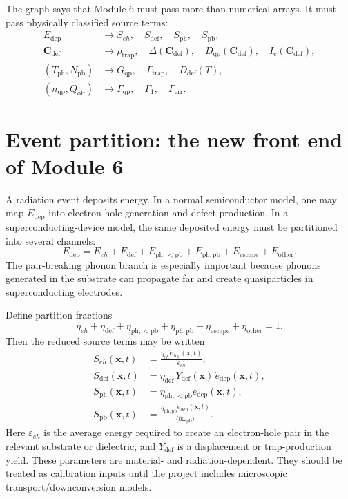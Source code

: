 \documentclass[11pt]{article}
\newcommand{\x}{\bm{x}}
\newcommand{\Edep}{E_{\mathrm{dep}}}
\newcommand{\edot}{\dot{e}_{\mathrm{dep}}}
\newcommand{\Qoff}{Q_{\mathrm{off}}}
\newcommand{\Cvec}{\bm{C}_{\mathrm{def}}}
\newcommand{\Tph}{T_{\mathrm{ph}}}
\newcommand{\Npb}{N_{\mathrm{pb}}}
\newcommand{\DeltaSC}{\Delta}
\newcommand{\nqp}{n_{\mathrm{qp}}}
\newcommand{\Dqp}{D_{\mathrm{qp}}}
\newcommand{\Gqp}{G_{\mathrm{qp}}}
\newcommand{\Gammaqp}{\Gamma_{\mathrm{qp}}}
\newcommand{\Gammaone}{\Gamma_1}
\newcommand{\Gammaerr}{\Gamma_{\mathrm{err}}}
\newcommand{\Ic}{I_{\mathrm{c}}}
\begin{document}
The graph says that Module 6 must pass more than numerical arrays. It must pass physically classified source terms:
\begin{align}
\Edep &\rightarrow S_{eh},\quad S_{\mathrm{def}},\quad S_{\mathrm{ph}},\quad S_{\mathrm{pb}},\\
\Cvec &\rightarrow \rho_{\mathrm{trap}},\quad \DeltaSC(\Cvec),\quad \Dqp(\Cvec),\quad \Ic(\Cvec),\\
(\Tph,\Npb) &\rightarrow \Gqp,\quad \Gamma_{\mathrm{trap}},\quad D_{\mathrm{def}}(T),\\
(\nqp,\Qoff) &\rightarrow \Gammaqp,\quad \Gammaone,\quad \Gammaerr.
\end{align}

\section{Event partition: the new front end of Module 6}

A radiation event deposits energy. In a normal semiconductor model, one may map \(\Edep\) into electron-hole generation and defect production. In a superconducting-device model, the same deposited energy must be partitioned into several channels:
\begin{equation}
\Edep
=E_{eh}+E_{\mathrm{def}}+E_{\mathrm{ph,<pb}}+E_{\mathrm{ph,pb}}+E_{\mathrm{escape}}+E_{\mathrm{other}}.
\end{equation}
The pair-breaking phonon branch is especially important because phonons generated in the substrate can propagate far and create quasiparticles in superconducting electrodes.

Define partition fractions
\begin{equation}
\eta_{eh}+\eta_{\mathrm{def}}+\eta_{\mathrm{ph,<pb}}+\eta_{\mathrm{ph,pb}}+\eta_{\mathrm{escape}}+\eta_{\mathrm{other}}=1.
\end{equation}
Then the reduced source terms may be written
\begin{align}
S_{eh}(\x,t) &= \frac{\eta_{eh}\edot(\x,t)}{\varepsilon_{eh}},\\
S_{\mathrm{def}}(\x,t) &= \eta_{\mathrm{def}}\,Y_{\mathrm{def}}(\x)\,\edot(\x,t),\\
S_{\mathrm{ph}}(\x,t) &= \eta_{\mathrm{ph,<pb}}\edot(\x,t),\\
S_{\mathrm{pb}}(\x,t) &= \frac{\eta_{\mathrm{ph,pb}}\edot(\x,t)}{\langle \hbar\omega_{\mathrm{pb}}\rangle}.
\end{align}
Here \(\varepsilon_{eh}\) is the average energy required to create an electron-hole pair in the relevant substrate or dielectric, and \(Y_{\mathrm{def}}\) is a displacement or trap-production yield. These parameters are material- and radiation-dependent. They should be treated as calibration inputs until the project includes microscopic transport/downconversion models.
\end{document}
